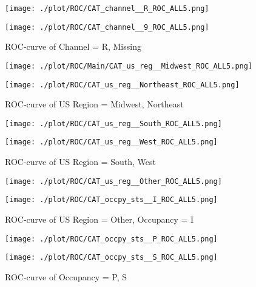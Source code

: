 \begin{figure}[H]
\begin{minipage}{.5\textwidth}
	\centering
	\texttt{[image: ./plot/ROC/CAT\_channel\_\_R\_ROC\_ALL5.png]}
\end{minipage}%
\begin{minipage}{.5\textwidth}
	\centering
	\texttt{[image: ./plot/ROC/CAT\_channel\_\_9\_ROC\_ALL5.png]}
\end{minipage}
    \caption{ROC-curve of Channel = R, Missing}
\end{figure}

\begin{figure}[H]
\begin{minipage}{.5\textwidth}
	\centering
	\texttt{[image: ./plot/ROC/Main/CAT\_us\_reg\_\_Midwest\_ROC\_ALL5.png]}
\end{minipage}%
\begin{minipage}{.5\textwidth}
	\centering
	\texttt{[image: ./plot/ROC/CAT\_us\_reg\_\_Northeast\_ROC\_ALL5.png]}
\end{minipage}
    \caption{ROC-curve of US Region = Midwest, Northeast}
\end{figure}

\begin{figure}[H]
\begin{minipage}{.5\textwidth}
	\centering
	\texttt{[image: ./plot/ROC/CAT\_us\_reg\_\_South\_ROC\_ALL5.png]}
\end{minipage}%
\begin{minipage}{.5\textwidth}
	\centering
	\texttt{[image: ./plot/ROC/CAT\_us\_reg\_\_West\_ROC\_ALL5.png]}
\end{minipage}
    \caption{ROC-curve of US Region = South, West}
\end{figure}

\begin{figure}[H]
\begin{minipage}{.5\textwidth}
	\centering
	\texttt{[image: ./plot/ROC/CAT\_us\_reg\_\_Other\_ROC\_ALL5.png]}
\end{minipage}%
\begin{minipage}{.5\textwidth}
	\centering
	\texttt{[image: ./plot/ROC/CAT\_occpy\_sts\_\_I\_ROC\_ALL5.png]}
\end{minipage}
    \caption{ROC-curve of US Region = Other, Occupancy = I}
\end{figure}

\begin{figure}[H]
\begin{minipage}{.5\textwidth}
	\centering
	\texttt{[image: ./plot/ROC/CAT\_occpy\_sts\_\_P\_ROC\_ALL5.png]}
\end{minipage}%
\begin{minipage}{.5\textwidth}
	\centering
	\texttt{[image: ./plot/ROC/CAT\_occpy\_sts\_\_S\_ROC\_ALL5.png]}
\end{minipage}
    \caption{ROC-curve of Occupancy = P, S}
\end{figure}

